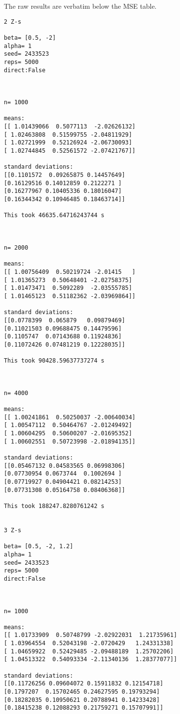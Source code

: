 \documentclass{article}
\theoremstyle{definition}
\theoremstyle{remark}
\begin{document}
\newpage

The raw results are verbatim below the MSE table.

\begin{verbatim}
2 Z-s

beta= [0.5, -2]
alpha= 1
seed= 2433523
reps= 5000
direct:False



n= 1000

means: 
[[ 1.01439066  0.5077113  -2.02626132]
[ 1.02463808  0.51599755 -2.04811929]
[ 1.02721999  0.52126924 -2.06730093]
[ 1.02744845  0.52561572 -2.07421767]]

standard deviations: 
[[0.1101572  0.09265875 0.14457649]
[0.16129516 0.14012859 0.2122271 ]
[0.16277967 0.10405336 0.18016047]
[0.16344342 0.10946485 0.18463714]]

This took 46635.64716243744 s



n= 2000

means: 
[[ 1.00756409  0.50219724 -2.01415   ]
[ 1.01365273  0.50648401 -2.02758375]
[ 1.01473471  0.5092289  -2.03555785]
[ 1.01465123  0.51182362 -2.03969864]]

standard deviations: 
[[0.0778399  0.065879   0.09879469]
[0.11021503 0.09688475 0.14479596]
[0.1105747  0.07143688 0.11924836]
[0.11072426 0.07481219 0.12228035]]

This took 90428.59637737274 s



n= 4000

means: 
[[ 1.00241861  0.50250037 -2.00640034]
[ 1.00547112  0.50464767 -2.01249492]
[ 1.00604295  0.50600207 -2.01695352]
[ 1.00602551  0.50723998 -2.01894135]]

standard deviations: 
[[0.05467132 0.04583565 0.06998306]
[0.07730954 0.0673744  0.1002694 ]
[0.07719927 0.04904421 0.08214253]
[0.07731308 0.05164758 0.08406368]]

This took 188247.8280761242 s


3 Z-s

beta= [0.5, -2, 1.2]
alpha= 1
seed= 2433523
reps= 5000
direct:False



n= 1000

means: 
[[ 1.01733909  0.50748799 -2.02922031  1.21735961]
[ 1.03964554  0.52043198 -2.0720429   1.24331338]
[ 1.04659922  0.52429485 -2.09488189  1.25702206]
[ 1.04513322  0.54093334 -2.11340136  1.28377077]]

standard deviations: 
[[0.11726256 0.09604072 0.15911832 0.12154718]
[0.1797207  0.15702465 0.24627595 0.19793294]
[0.18282035 0.10950621 0.20788941 0.14233428]
[0.18415238 0.12088293 0.21759271 0.15707991]]


\end{verbatim}
\end{document}
